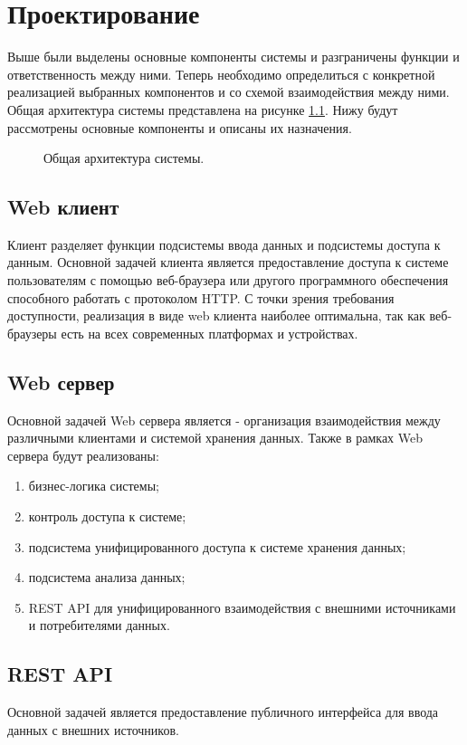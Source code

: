 \newpage
\chapter{Проектирование}
Выше были выделены основные компоненты системы и разграничены функции и
ответственность между ними. Теперь необходимо определиться с конкретной
реализацией выбранных компонентов и со схемой взаимодействия между ними. 
Общая архитектура системы представлена на рисунке
\ref{ris:general_architecture}. Нижу будут рассмотрены основные компоненты
и описаны их назначения.

\begin{figure}[h]
\caption{Общая архитектура системы.}
\label{ris:general_architecture}
\end{figure}

\section{Web клиент}
Клиент разделяет функции подсистемы ввода данных и подсистемы доступа к данным.
Основной задачей клиента является предоставление доступа к системе пользователям
с помощью веб-браузера или другого программного обеспечения способного работать
с протоколом HTTP. С точки зрения требования доступности, реализация в виде web
клиента наиболее оптимальна, так как веб-браузеры есть на всех современных
платформах и устройствах.

\section{Web сервер}
Основной задачей Web сервера является - организация взаимодействия между
различными клиентами и системой хранения данных. Также в рамках Web сервера
будут реализованы:
\begin{enumerate}
  \item бизнес-логика системы;
  \item контроль доступа к системе;
  \item подсистема унифицированного доступа к системе хранения данных;
  \item подсистема анализа данных;
  \item REST API для унифицированного взаимодействия с внешними источниками и
потребителями данных.
\end{enumerate}

\section{REST API}
Основной задачей является предоставление публичного интерфейса для ввода данных
с внешних источников.

